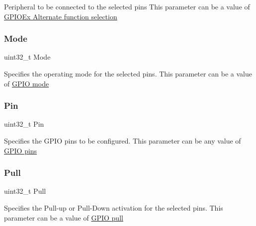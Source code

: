 Peripheral to be connected to the selected pins This parameter can be a value of \hyperlink{group___g_p_i_o_ex___alternate__function__selection}{G\+P\+I\+O\+Ex Alternate function selection} \mbox{\label{struct_g_p_i_o___init_type_def_a0ffc93ec511ed9cf1663f6939bd3e839}} 
\subsubsection{\texorpdfstring{Mode}{Mode}}
{\footnotesize\ttfamily uint32\+\_\+t Mode}

Specifies the operating mode for the selected pins. This parameter can be a value of \hyperlink{group___g_p_i_o__mode}{G\+P\+IO mode} \mbox{\label{struct_g_p_i_o___init_type_def_a871d0ab74071724e96b7cc9ae2a7532b}} 
\subsubsection{\texorpdfstring{Pin}{Pin}}
{\footnotesize\ttfamily uint32\+\_\+t Pin}

Specifies the G\+P\+IO pins to be configured. This parameter can be any value of \hyperlink{group___g_p_i_o__pins}{G\+P\+IO pins} \mbox{\label{struct_g_p_i_o___init_type_def_a6cdde08eb507b710f8179a4326548e26}} 
\subsubsection{\texorpdfstring{Pull}{Pull}}
{\footnotesize\ttfamily uint32\+\_\+t Pull}

Specifies the Pull-\/up or Pull-\/\+Down activation for the selected pins. This parameter can be a value of \hyperlink{group___g_p_i_o__pull}{G\+P\+IO pull} \mbox{\label{struct_g_p_i_o___init_type_def_ad04b2041f59d32492ec36a891418f3fd}} 
